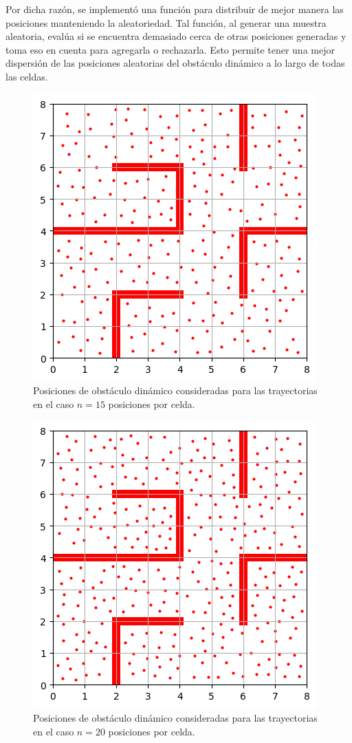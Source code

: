 \documentclass[spanish,mexico]{article}
\numberwithin{equation}{section}
\theoremstyle{definition}
\theoremstyle{remark}
\begin{document}
Por dicha razón, se implementó una función para distribuir de mejor manera las posiciones manteniendo la aleatoriedad. Tal función, al generar una muestra aleatoria, evalúa si se encuentra demasiado cerca de otras posiciones generadas y toma eso en cuenta para agregarla o rechazarla. Esto permite tener una mejor dispersión de las posiciones aleatorias del obstáculo dinámico a lo largo de todas las celdas.

\begin{figure}[hbtp]
\centering
\includegraphics[scale=0.7]{img/15.png}
\caption{Posiciones de obstáculo dinámico consideradas para las trayectorias en el caso $n=15$ posiciones por celda.}
\end{figure}

\begin{figure}[h!]
\centering
\includegraphics[scale=0.7]{img/20.png}
\caption{Posiciones de obstáculo dinámico consideradas para las trayectorias en el caso $n=20$ posiciones por celda.}
\end{figure}
\newpage
\end{document}
